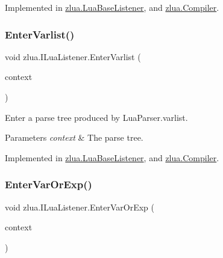 Implemented in \mbox{\hyperlink{classzlua_1_1_lua_base_listener_a45218c758db2cd6275fe4e000ae9a77e}{zlua.\+Lua\+Base\+Listener}}, and \mbox{\hyperlink{classzlua_1_1_compiler_aa81e525edf991e9e6a3e391814d449fe}{zlua.\+Compiler}}.

\mbox{\label{interfacezlua_1_1_i_lua_listener_a6803c862c7298f17d74bfcda8f6f159e}} 
\subsubsection{\texorpdfstring{Enter\+Varlist()}{EnterVarlist()}}
{\footnotesize\ttfamily void zlua.\+I\+Lua\+Listener.\+Enter\+Varlist (\begin{DoxyParamCaption}\item[{\mbox{[}\+Not\+Null\mbox{]} \mbox{\hyperlink{classzlua_1_1_lua_parser_1_1_varlist_context}{Lua\+Parser.\+Varlist\+Context}}}]{context }\end{DoxyParamCaption})}



Enter a parse tree produced by Lua\+Parser.\+varlist. 


\begin{DoxyParams}{Parameters}
{\em context} & The parse tree.\\
\hline
\end{DoxyParams}


Implemented in \mbox{\hyperlink{classzlua_1_1_lua_base_listener_a1b27cf500dda1c0eab2cbb8c747dddba}{zlua.\+Lua\+Base\+Listener}}, and \mbox{\hyperlink{classzlua_1_1_compiler_ad7137ae6c666bc8dedb3cd24c8b22c49}{zlua.\+Compiler}}.

\mbox{\label{interfacezlua_1_1_i_lua_listener_aece0cb0bc8e75c07d7bf71375714a6e7}} 
\subsubsection{\texorpdfstring{Enter\+Var\+Or\+Exp()}{EnterVarOrExp()}}
{\footnotesize\ttfamily void zlua.\+I\+Lua\+Listener.\+Enter\+Var\+Or\+Exp (\begin{DoxyParamCaption}\item[{\mbox{[}\+Not\+Null\mbox{]} \mbox{\hyperlink{classzlua_1_1_lua_parser_1_1_var_or_exp_context}{Lua\+Parser.\+Var\+Or\+Exp\+Context}}}]{context }\end{DoxyParamCaption})}



